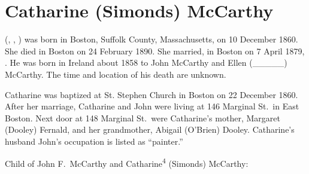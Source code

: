 \section{Catharine (Simonds) McCarthy}

 (, , ) was born in Boston, Suffolk County, Massachusetts, on 10 December 1860.\cite{Catharine4SimondsBirth} She died in Boston on 24 February 1890.\cite{Catharine4SimondsDeath} She married, in Boston on 7 April 1879, .\cite{JohnMcCarthyMarriage} He was born in Ireland about 1858 to John McCarthy and Ellen (\_\_\_\_\_) McCarthy.\cite{JohnMcCarthyMarriage} The time and location of his death are unknown.

Catharine was baptized at St. Stephen Church in Boston on 22 December 1860.\cite{Catharine4SimondsBaptism} After her marriage, Catharine and John were living at 146 Marginal St.\ in East Boston. Next door at 148 Marginal St.\ were Catharine's mother, Margaret (Dooley) Fernald, and her grandmother, Abigail (O'Brien) Dooley. Catharine's husband John's occupation is listed as ``painter.''\cite{Census1880Catharine4Simonds}

\begin{KidsIntro}
	Child of John F.\ McCarthy and Catharine\textsuperscript{4} (Simonds) McCarthy:
\end{KidsIntro}

